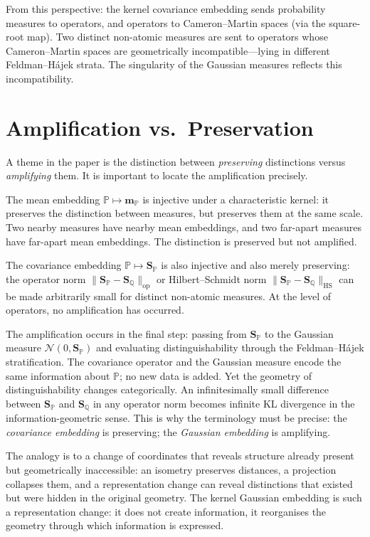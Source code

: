 \documentclass[12pt, oneside]{book}
\theoremstyle{plain}
\theoremstyle{definition}
\newcommand{\calN}{\mathcal{N}}
\newcommand{\PP}{\mathbb{P}}
\newcommand{\QQ}{\mathbb{Q}}
\newcommand{\HS}{\mathrm{HS}}
\newcommand{\op}{\mathrm{op}}
\newcommand{\mP}{\mathbf{m}_{\PP}}
\newcommand{\SP}{\mathbf{S}_{\PP}}
\newcommand{\SQ}{\mathbf{S}_{\QQ}}
\begin{document}
From this perspective: the kernel covariance embedding sends probability measures to operators, and operators to Cameron--Martin spaces (via the square-root map). Two distinct non-atomic measures are sent to operators whose Cameron--Martin spaces are geometrically incompatible---lying in different Feldman--H\'ajek strata. The singularity of the Gaussian measures reflects this incompatibility.

\section{Amplification vs.\ Preservation}

A theme in the paper is the distinction between \emph{preserving} distinctions versus \emph{amplifying} them. It is important to locate the amplification precisely.

The mean embedding $\PP \mapsto \mP$ is injective under a characteristic kernel: it preserves the distinction between measures, but preserves them at the same scale. Two nearby measures have nearby mean embeddings, and two far-apart measures have far-apart mean embeddings. The distinction is preserved but not amplified.

The covariance embedding $\PP \mapsto \SP$ is also injective and also merely preserving: the operator norm $\|\SP - \SQ\|_{\op}$ or Hilbert--Schmidt norm $\|\SP - \SQ\|_{\HS}$ can be made arbitrarily small for distinct non-atomic measures. At the level of operators, no amplification has occurred.

The amplification occurs in the final step: passing from $\SP$ to the Gaussian measure $\calN(0, \SP)$ and evaluating distinguishability through the Feldman--H\'ajek stratification. The covariance operator and the Gaussian measure encode the same information about $\PP$; no new data is added. Yet the geometry of distinguishability changes categorically. An infinitesimally small difference between $\SP$ and $\SQ$ in any operator norm becomes infinite KL divergence in the information-geometric sense. This is why the terminology must be precise: the \emph{covariance embedding} is preserving; the \emph{Gaussian embedding} is amplifying.

The analogy is to a change of coordinates that reveals structure already present but geometrically inaccessible: an isometry preserves distances, a projection collapses them, and a representation change can reveal distinctions that existed but were hidden in the original geometry. The kernel Gaussian embedding is such a representation change: it does not create information, it reorganises the geometry through which information is expressed.
\end{document}

